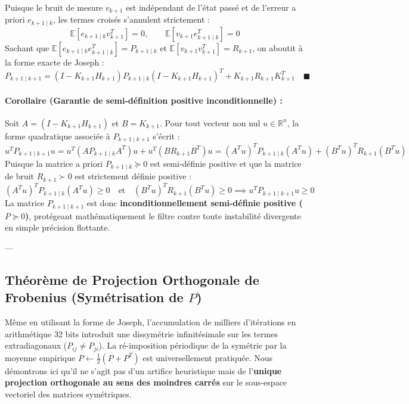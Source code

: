 \documentclass[../Formulations_Kalman.tex]{subfiles}
\begin{document}
Puisque le bruit de mesure $v_{k+1}$ est indépendant de l'état passé et de l'erreur a priori $e_{k+1\mid k}$, les termes croisés s'annulent strictement :
\begin{equation}
\mathbb{E}\left[ e_{k+1\mid k} v_{k+1}^T \right] = 0, \qquad \mathbb{E}\left[ v_{k+1} e_{k+1\mid k}^T \right] = 0
\end{equation}
Sachant que $\mathbb{E}[e_{k+1\mid k} e_{k+1\mid k}^T] = P_{k+1\mid k}$ et $\mathbb{E}[v_{k+1} v_{k+1}^T] = R_{k+1}$, on aboutit à la forme exacte de Joseph :
\begin{equation}
P_{k+1\mid k+1} = (I - K_{k+1} H_{k+1}) P_{k+1\mid k} (I - K_{k+1} H_{k+1})^T + K_{k+1} R_{k+1} K_{k+1}^T \quad \blacksquare
\end{equation}

\paragraph{Corollaire (Garantie de semi-définition positive inconditionnelle) :}
Soit $A = (I - K_{k+1} H_{k+1})$ et $B = K_{k+1}$. Pour tout vecteur non nul $u \in \mathbb{R}^n$, la forme quadratique associée à $P_{k+1\mid k+1}$ s'écrit :
\begin{equation}
u^T P_{k+1\mid k+1} u = u^T (A P_{k+1\mid k} A^T) u + u^T (B R_{k+1} B^T) u = (A^T u)^T P_{k+1\mid k} (A^T u) + (B^T u)^T R_{k+1} (B^T u)
\end{equation}
Puisque la matrice a priori $P_{k+1\mid k} \succeq 0$ est semi-définie positive et que la matrice de bruit $R_{k+1} \succ 0$ est strictement définie positive :
\begin{equation}
(A^T u)^T P_{k+1\mid k} (A^T u) \ge 0 \quad \text{et} \quad (B^T u)^T R_{k+1} (B^T u) \ge 0 \implies u^T P_{k+1\mid k+1} u \ge 0
\end{equation}
La matrice $P_{k+1\mid k+1}$ est donc \textbf{inconditionnellement semi-définie positive ($P \succeq 0$)}, protégeant mathématiquement le filtre contre toute instabilité divergente en simple précision flottante.

---

\subsection{\texorpdfstring{Théorème de Projection Orthogonale de Frobenius (Symétrisation de $P$)}{Théorème de Projection Orthogonale de Frobenius (Symétrisation de P)}}
\label{annexe:frobenius}

Même en utilisant la forme de Joseph, l'accumulation de milliers d'itérations en arithmétique 32 bits introduit une dissymétrie infinitésimale sur les termes extradiagonaux ($P_{ij} \neq P_{ji}$). La ré-imposition périodique de la symétrie par la moyenne empirique $P \leftarrow \frac{1}{2}(P + P^T)$ est universellement pratiquée. Nous démontrons ici qu'il ne s'agit pas d'un artifice heuristique mais de l'\textbf{unique projection orthogonale au sens des moindres carrés} sur le sous-espace vectoriel des matrices symétriques.
\end{document}
